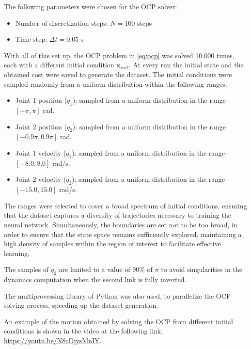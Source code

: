 \noindent The following parameters were chosen for the OCP solver:
\begin{itemize}[noitemsep]
    \item Number of discretization steps: $N = 100$ steps
    \item Time step: $\Delta t = 0.05$ s
\end{itemize}

\noindent With all of this set up, the OCP problem in \eqref{eq:ocp} was solved 10.000 times, each with a different initial condition $\mathbf{x}_{init}$. At every run the initial state and the obtained cost were saved to generate the dataset. The initial conditions were sampled randomly from a uniform distribution within the following ranges:

\begin{itemize}[noitemsep]
    \item Joint 1 position ($q_1$): sampled from a uniform distribution in the range $[-\pi, \pi]$ rad.
    \item Joint 2 position ($q_2$): sampled from a uniform distribution in the range $[-0.9\pi, 0.9\pi]$ rad.
    \item Joint 1 velocity ($\dot{q}_1$): sampled from a uniform distribution in the range $[-8.0, 8.0]$ rad/s.
    \item Joint 2 velocity ($\dot{q}_2$): sampled from a uniform distribution in the range $[-15.0, 15.0]$ rad/s.
\end{itemize}

\noindent The ranges were selected to cover a broad spectrum of initial conditions, ensuring that the dataset captures a diversity of trajectories necessary to training the neural network. Simultaneously, the boundaries are set not to be too broad, in order to ensure that the state space remains sufficiently explored, maintaining a high density of samples within the region of interest to facilitate effective learning.

The samples of $q_2$ are limited to a value of $90\%$ of $\pi$ to avoid singularities in the dynamics computation when the second link is fully inverted.

The multiprocessing library of Python was also used, to parallelize the OCP solving process, speeding up the dataset generation.

\noindent An example of the motion obtained by solving the OCP from different initial conditions is shown in the video at the following link: \url{https://youtu.be/N8cDjysMnIY}. 

